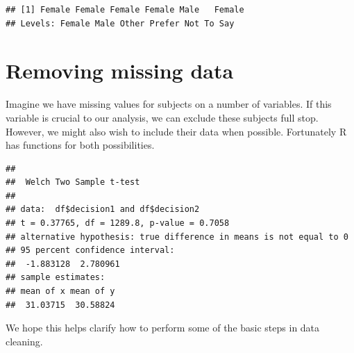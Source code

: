 \documentclass[
]{book}
\newenvironment{Shaded}{\begin{snugshade}}{\end{snugshade}}
\newcommand{\AttributeTok}[1]{\textcolor[rgb]{0.77,0.63,0.00}{#1}}
\newcommand{\CommentTok}[1]{\textcolor[rgb]{0.56,0.35,0.01}{\textit{#1}}}
\newcommand{\ConstantTok}[1]{\textcolor[rgb]{0.00,0.00,0.00}{#1}}
\newcommand{\FunctionTok}[1]{\textcolor[rgb]{0.00,0.00,0.00}{#1}}
\newcommand{\NormalTok}[1]{#1}
\newcommand{\OtherTok}[1]{\textcolor[rgb]{0.56,0.35,0.01}{#1}}
\newcommand{\SpecialCharTok}[1]{\textcolor[rgb]{0.00,0.00,0.00}{#1}}
\begin{document}
\begin{verbatim}
## [1] Female Female Female Female Male   Female
## Levels: Female Male Other Prefer Not To Say
\end{verbatim}

\hypertarget{removing-missing-data}{%
\section{Removing missing data}\label{removing-missing-data}}

Imagine we have missing values for subjects on a number of variables. If this variable is crucial to our analysis, we can exclude these subjects full stop. However, we might also wish to include their data when possible. Fortunately R has functions for both possibilities.

\begin{Shaded}
\end{Shaded}

\begin{verbatim}
## 
##  Welch Two Sample t-test
## 
## data:  df$decision1 and df$decision2
## t = 0.37765, df = 1289.8, p-value = 0.7058
## alternative hypothesis: true difference in means is not equal to 0
## 95 percent confidence interval:
##  -1.883128  2.780961
## sample estimates:
## mean of x mean of y 
##  31.03715  30.58824
\end{verbatim}

We hope this helps clarify how to perform some of the basic steps in data cleaning.

  
\end{document}
